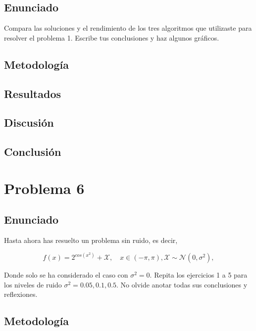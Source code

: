 \documentclass{article}
\begin{document}
\subsection{Enunciado}

Compara las soluciones y el rendimiento de los tres algoritmos que utilizaste para resolver el problema 1. Escribe tus conclusiones y haz algunos gráficos.

\subsection{Metodología}

\subsection{Resultados}
\setcounter{equation}{0}

\subsection{Discusión}

\subsection{Conclusión}

\section{Problema 6}

\subsection{Enunciado}

Hasta ahora has resuelto un problema sin ruido, es decir,

\begin{equation*}
    f(x)=2^{cos(x^2)}+\mathcal{X}, \quad x \in (-\pi,\pi), \mathcal{X} \sim \mathcal{N}(0,\sigma^{2}),
\end{equation*}

Donde solo se ha considerado el caso con $\sigma^2=0$. Repita los ejercicios 1 a 5 para los niveles de ruido $\sigma^2 = 0.05,0.1,0.5$. No olvide anotar todas sus conclusiones y reflexiones.

\subsection{Metodología}
\end{document}
